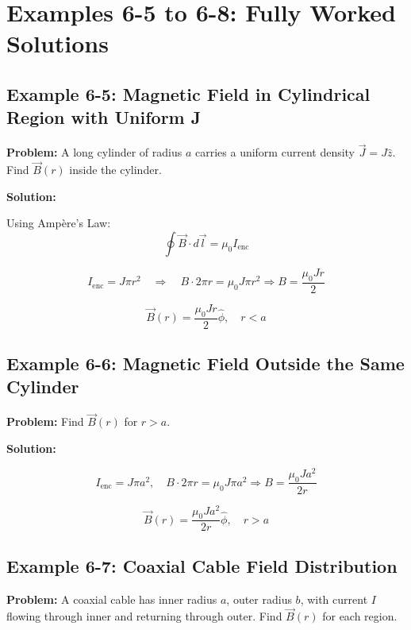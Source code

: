 \documentclass[12pt]{article}
\begin{document}
\section*{Examples 6-5 to 6-8: Fully Worked Solutions}

\subsection*{Example 6-5: Magnetic Field in Cylindrical Region with Uniform J}

\textbf{Problem:}  
A long cylinder of radius \( a \) carries a uniform current density \( \vec{J} = J \hat{z} \). Find \( \vec{B}(r) \) inside the cylinder.

\textbf{Solution:}

Using Ampère’s Law:
\[
\oint \vec{B} \cdot d\vec{l} = \mu_0 I_{\text{enc}}
\]

\[
I_{\text{enc}} = J \pi r^2 \quad \Rightarrow \quad B \cdot 2\pi r = \mu_0 J \pi r^2
\Rightarrow B = \frac{\mu_0 J r}{2}
\]

\begin{tcolorbox}
\[
\boxed{\vec{B}(r) = \frac{\mu_0 J r}{2} \hat{\phi}}, \quad r < a
\]
\end{tcolorbox}

\subsection*{Example 6-6: Magnetic Field Outside the Same Cylinder}

\textbf{Problem:}  
Find \( \vec{B}(r) \) for \( r > a \).

\textbf{Solution:}

\[
I_{\text{enc}} = J \pi a^2, \quad B \cdot 2\pi r = \mu_0 J \pi a^2
\Rightarrow B = \frac{\mu_0 J a^2}{2r}
\]

\begin{tcolorbox}
\[
\boxed{\vec{B}(r) = \frac{\mu_0 J a^2}{2r} \hat{\phi}}, \quad r > a
\]
\end{tcolorbox}

\subsection*{Example 6-7: Coaxial Cable Field Distribution}

\textbf{Problem:}  
A coaxial cable has inner radius \( a \), outer radius \( b \), with current \( I \) flowing through inner and returning through outer. Find \( \vec{B}(r) \) for each region.
\end{document}
